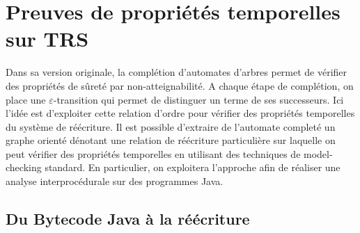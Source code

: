 \chapter{Preuves de propriétés temporelles sur TRS}

Dans sa version originale, la complétion d'automates d'arbres permet
de vérifier des propriétés de sûreté par non-atteignabilité.
A chaque étape de complétion, on place une $\varepsilon$-transition
qui permet de distinguer un terme de ses successeurs. Ici l'idée
est d'exploiter cette relation d'ordre pour vérifier des propriétés 
temporelles du système de réécriture. Il est possible d'extraire de l'automate
completé un graphe orienté dénotant une relation de réécriture particulière
sur laquelle on peut vérifier des propriétés temporelles en utilisant des
techniques de model-checking standard. En particulier, on exploitera
l'approche afin de réaliser une analyse interprocédurale
sur des programmes Java.




\section{Du Bytecode Java à la réécriture}

